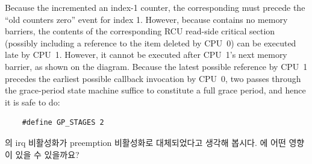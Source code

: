 Because the  incremented an index-1 counter,
the corresponding  must
precede the ``old counters zero'' event for index 1.
However, because  contains no memory
barriers, the contents of the corresponding RCU read-side critical
section (possibly including a reference to the item deleted by
CPU~0) can be executed late by CPU~1.
However, it cannot be executed after CPU~1's next memory barrier,
as shown on the diagram.
Because the latest possible reference by CPU~1 precedes the
earliest possible callback invocation by CPU~0, two passes
through the grace-period state machine suffice to constitute
a full grace period, and hence it is safe to do:
\fi

\vspace{5pt}
\begin{minipage}[t]{\columnwidth}
\small
\begin{verbatim}
    #define GP_STAGES 2
\end{verbatim}
\end{minipage}
\vspace{5pt}

\QuickQuiz{}
	 의 irq 비활성화가 preemption 비활성화로
	대체되었다고 생각해 봅시다.
	 에 어떤 영향이 있을 수 있을까요?
	\iffalse

